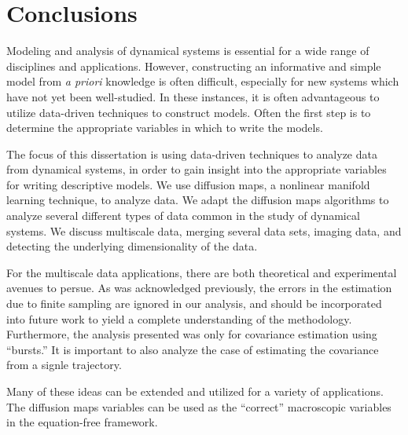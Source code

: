 
\chapter{Conclusions \label{ch:conclusion}}

Modeling and analysis of dynamical systems is essential for a wide range of disciplines and applications. 
%
However, constructing an informative and simple model from {\em a priori} knowledge is often difficult, especially for new systems which have not yet been well-studied. 
%
In these instances, it is often advantageous to utilize data-driven techniques to construct models.
%
Often the first step is to determine the appropriate variables in which to write the models. 

The focus of this dissertation is using data-driven techniques to analyze data from dynamical systems, in order to gain insight into the appropriate variables for writing descriptive models. 
%
We use diffusion maps, a nonlinear manifold learning technique, to analyze data.
%
We adapt the diffusion maps algorithms to analyze several different types of data common in the study of dynamical systems. 
%
We discuss multiscale data, merging several data sets, imaging data, and detecting the underlying dimensionality of the data. 

For the multiscale data applications, there are both theoretical and experimental avenues to persue. 
%
As was acknowledged previously, the errors in the estimation due to finite sampling are ignored in our analysis, and should be incorporated into future work to yield a complete understanding of the methodology. 
%
Furthermore, the analysis presented was only for covariance estimation using ``bursts.''
%
It is important to also analyze the case of estimating the covariance from a signle trajectory.


Many of these ideas can be extended and utilized for a variety of applications. 
%
The diffusion maps variables can be used as the ``correct'' macroscopic variables in the equation-free framework. 
%
